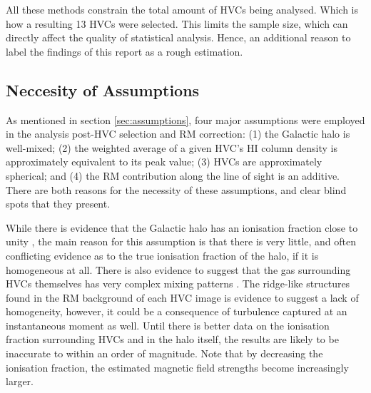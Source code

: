 All these methods constrain the total amount of HVCs being analysed. Which is how a resulting 13 HVCs were selected. This limits the sample size, which can directly affect the quality of statistical analysis. Hence, an additional reason to label the findings of this report as a rough estimation.

\subsection{Neccesity of Assumptions}
\label{ssec:B2}

As mentioned in section \ref{sec:assumptions}, four major assumptions were employed in the analysis post-HVC selection and RM correction: (1) the Galactic halo is well-mixed; (2) the weighted average of a given HVC's HI column density is approximately equivalent to its peak value; (3) HVCs are approximately spherical; and (4) the RM contribution along the line of sight is an additive. There are both reasons for the necessity of these assumptions, and clear blind spots that they present.


While there is evidence that the Galactic halo has an ionisation fraction close to unity \citep{ID23}, the main reason for this assumption is that there is very little, and often conflicting evidence as to the true ionisation fraction of the halo, if it is homogeneous at all. There is also evidence to suggest that the gas surrounding HVCs themselves has very complex mixing patterns \cite{ID69}. The ridge-like structures found in the RM background of each HVC image is evidence to suggest a lack of homogeneity, however, it could be a consequence of turbulence captured at an instantaneous moment as well. Until there is better data on the ionisation fraction surrounding HVCs and in the halo itself, the results are likely to be inaccurate to within an order of magnitude. Note that by decreasing the ionisation fraction, the estimated magnetic field strengths become increasingly larger.


